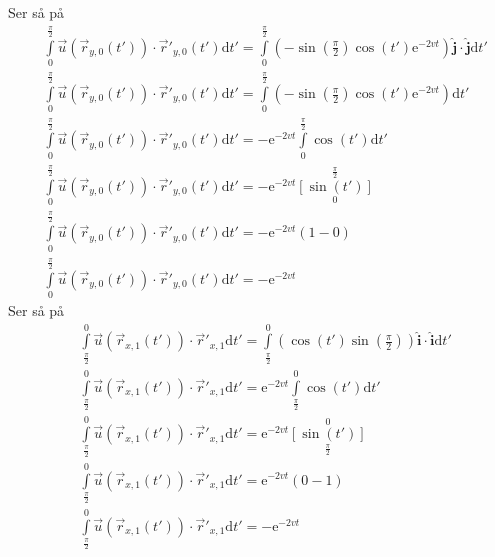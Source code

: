 \documentclass[a4paper,10pt,norsk]{article}
\newcommand{\dd}[1]{\mathrm{d}#1}
\newcommand{\uvec}[1]{\boldsymbol{\hat{\textbf{#1}}}}
\begin{document}
		Ser så på
		\begin{align*}
			&\int\limits_0^{\frac{\pi}{2}} \vec{u} \left( \vec{r}_{y,0}(t')  \right) \cdot \overrightarrow{r}'_{y,0}(t') \dd{t'} =
			\int\limits_0^{\frac{\pi}{2}}\left( -\sin \left( \frac{\pi}{2} \right) \cos(t') \mathrm{e}^{-2vt}  \right)\uvec{j} \cdot \uvec{j}\dd{t'}\\
			&\int\limits_0^{\frac{\pi}{2}} \vec{u} \left( \vec{r}_{y,0}(t')  \right) \cdot \overrightarrow{r}'_{y,0}(t') \dd{t'} =
			\int\limits_0^{\frac{\pi}{2}}\left( -\sin \left( \frac{\pi}{2} \right) \cos(t') \mathrm{e}^{-2vt}  \right) \dd{t'}\\
			&\int\limits_0^{\frac{\pi}{2}} \vec{u} \left( \vec{r}_{y,0}(t')  \right) \cdot \overrightarrow{r}'_{y,0}(t') \dd{t'} =
			-\mathrm{e}^{-2vt} \int\limits_0^{\frac{\pi}{2}} \cos(t') \dd{t'}\\
			&\int\limits_0^{\frac{\pi}{2}} \vec{u} \left( \vec{r}_{y,0}(t')  \right) \cdot \overrightarrow{r}'_{y,0}(t') \dd{t'} =
			-\mathrm{e}^{-2vt} \left[ \sin(t') \right]\limits_0^{\frac{\pi}{2}}\\
			&\int\limits_0^{\frac{\pi}{2}} \vec{u} \left( \vec{r}_{y,0}(t')  \right) \cdot \overrightarrow{r}'_{y,0}(t') \dd{t'} = - \mathrm{e}^{-2vt} \left( 1 - 0 \right) \\
			&\int\limits_0^{\frac{\pi}{2}} \vec{u} \left( \vec{r}_{y,0}(t')  \right) \cdot \overrightarrow{r}'_{y,0}(t') \dd{t'} = - \mathrm{e}^{-2vt}
		\end{align*}
		Ser så på
		\begin{align*}
			&\int\limits_{\frac{\pi}{2}}^0 \vec{u} \left( \vec{r}_{x,1}(t') \right) \cdot \overrightarrow{r}'_{x,1} \dd{t'} = 
			\int\limits_{\frac{\pi}{2}}^0 \left( \cos(t') \sin\left (\frac{\pi}{2} \right)  \right) \uvec{i} \cdot \uvec{i} \dd{t'}\\
			&\int\limits_{\frac{\pi}{2}}^0 \vec{u} \left( \vec{r}_{x,1}(t') \right) \cdot \overrightarrow{r}'_{x,1} \dd{t'} =
			\mathrm{e}^{-2vt}\int\limits_{\frac{\pi}{2}}^0 \cos(t') \dd{t'}\\ 
			&\int\limits_{\frac{\pi}{2}}^0 \vec{u} \left( \vec{r}_{x,1}(t') \right) \cdot \overrightarrow{r}'_{x,1} \dd{t'} =
			\mathrm{e}^{-2vt} \left[ \sin(t') \right]\limits_{\frac{\pi}{2}}^0\\
			&\int\limits_{\frac{\pi}{2}}^0 \vec{u} \left( \vec{r}_{x,1}(t') \right) \cdot \overrightarrow{r}'_{x,1} \dd{t'} =
			\mathrm{e}^{-2vt} \left( 0-1 \right) \\
			&\int\limits_{\frac{\pi}{2}}^0 \vec{u} \left( \vec{r}_{x,1}(t') \right) \cdot \overrightarrow{r}'_{x,1} \dd{t'} =
			-\mathrm{e}^{-2vt}
		\end{align*}
\end{document}
